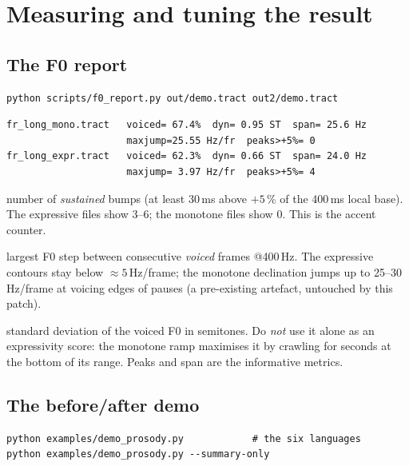 \documentclass[11pt,a4paper]{article}
\begin{document}
\section{Measuring and tuning the result}\label{sec:measure}

\subsection{The F0 report}

\begin{lstlisting}[style=shell]
python scripts/f0_report.py out/demo.tract out2/demo.tract
\end{lstlisting}

\begin{lstlisting}[style=verbatim]
fr_long_mono.tract   voiced= 67.4%  dyn= 0.95 ST  span= 25.6 Hz
                     maxjump=25.55 Hz/fr  peaks>+5%= 0
fr_long_expr.tract   voiced= 62.3%  dyn= 0.66 ST  span= 24.0 Hz
                     maxjump= 3.97 Hz/fr  peaks>+5%= 4
\end{lstlisting}

\begin{description}[itemsep=1pt]
\item[peaks>\,+5\,\%] number of \emph{sustained} bumps (at least
  30\,ms above $+5$\,\% of the 400\,ms local base). The expressive
  files show 3--6; the monotone files show 0. This is the accent
  counter.
\item[maxjump] largest F0 step between consecutive \emph{voiced}
  frames @400\,Hz. The expressive contours stay below
  $\approx 5$\,Hz/frame; the monotone declination jumps up to
  25--30\,Hz/frame at voicing edges of pauses (a pre-existing
  artefact, untouched by this patch).
\item[dyn] standard deviation of the voiced F0 in semitones. Do
  \emph{not} use it alone as an expressivity score: the monotone
  ramp maximises it by crawling for seconds at the bottom of its
  range. Peaks and span are the informative metrics.
\end{description}

\subsection{The before/after demo}

\begin{lstlisting}[style=shell]
python examples/demo_prosody.py            # the six languages
python examples/demo_prosody.py --summary-only
\end{lstlisting}
\end{document}
